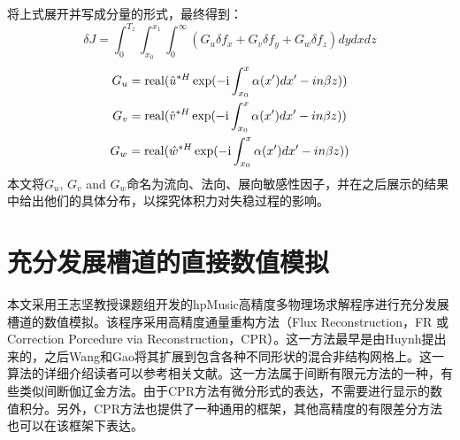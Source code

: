 将上式展开并写成分量的形式，最终得到：
\begin{equation}
\label{e:adjointresult}
\delta J = \int_0^{T_z } {\int_{x_0 }^{x_1 } {\int_0^\infty  {\left( {G_u \delta f_x  + G_v \delta f_y  + G_w \delta f_z } \right)dydxdz} } }
\end{equation}
\begin{equation}
\label{e:G}
\begin{gathered}
G_u  = {\rm real}(\hat u^{*H} \exp({ - {\rm i}\int_{x_0 }^x {\alpha (x')dx'}  - in\beta z}) )\\
G_v  = {\rm real}(\hat v^{*H} \exp({ - {\rm i}\int_{x_0 }^x {\alpha (x')dx'}  - in\beta z}) )\\
G_w  = {\rm real}(\hat w^{*H} \exp({ - {\rm i}\int_{x_0 }^x {\alpha (x')dx'}  - in\beta z}) )\\
\end{gathered}
\end{equation}
本文将$G_u$, $G_v$ and $G_w$命名为流向、法向、展向敏感性因子，并在之后展示的结果中给出他们的具体分布，以探究体积力对失稳过程的影响。
\section{充分发展槽道的直接数值模拟}\label{sec:DNS}
本文采用王志坚教授课题组开发的hpMusic高精度多物理场求解程序进行充分发展槽道的数值模拟。该程序采用高精度通量重构方法（Flux Reconstruction，FR 或 Correction Porcedure via Reconstruction，CPR）。这一方法最早是由Huynh\cite{Huynh2007}提出来的，之后Wang和Gao\cite{WangGao2009}将其扩展到包含各种不同形状的混合非结构网格上。这一算法的详细介绍读者可以参考相关文献\cite{Vincent2011,Jameson2012,GaoWang2013,Zhu2016,Zh2017}。这一方法属于间断有限元方法的一种，有些类似间断伽辽金方法。由于CPR方法有微分形式的表达，不需要进行显示的数值积分。另外，CPR方法也提供了一种通用的框架，其他高精度的有限差分方法也可以在该框架下表达。

